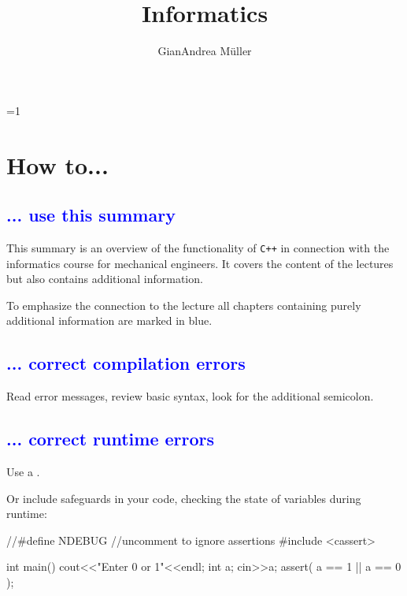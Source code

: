\documentclass[10pt,a4paper]{scrartcl}
\title{Informatics}
\author{GianAndrea Müller}
\gdef\conditionmacro{1}
\begin{document}
\begin{multicols*}{4}
\maketitle
\tableofcontents
\end{multicols*}

\begin{multicols*}{2}

\newcommand{\ntn}[1]{\textcolor{blue}{#1}}

\ifnum\conditionmacro=1
\section{How to...}

\subsection{\ntn{... use this summary}}

This summary is an overview of the functionality of \verb.C++. in connection with the informatics course for mechanical engineers. It covers the content of the lectures but also contains additional information.

To emphasize the connection to the lecture all chapters containing purely additional information are marked in blue.

\subsection{\ntn{... correct compilation errors}}

Read error messages, review basic syntax, look for the additional semicolon.

\subsection{\ntn{... correct runtime errors}}

Use a .

Or include safeguards in your code, checking the state of variables during runtime:

\begin{TPCpp}
//#define NDEBUG  //uncomment to ignore assertions
#include <cassert>

int main(){
	cout<<"Enter 0 or 1"<<endl;
	int a;
	cin>>a;
	assert( a == 1 || a == 0 );
}
\end{TPCpp}


\end{multicols*}
\end{document}

